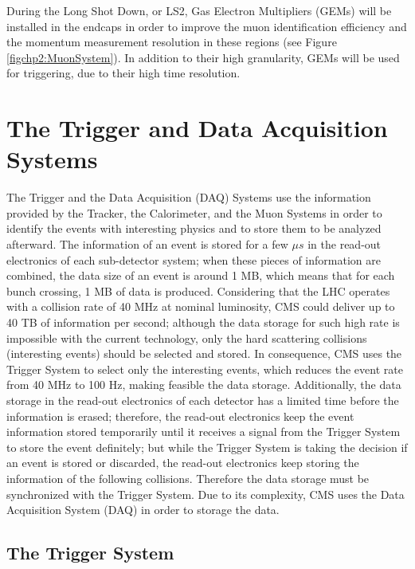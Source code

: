 \noindent During the Long Shot Down, or LS2, Gas Electron Multipliers (GEMs) will be installed in 
the endcaps in order to improve the muon identification efficiency and
the momentum measurement resolution in these regions (see Figure \ref{figchp2:MuonSystem}). In 
addition to their high granularity, GEMs will be used for triggering,
due to their high time resolution.

\section{The Trigger and Data Acquisition Systems}
\label{sec:Trigger}

\noindent The Trigger and the Data Acquisition (DAQ) Systems use the information 
provided by the Tracker, the Calorimeter, and the Muon Systems in order 
to identify the events with interesting physics and to store them to be 
analyzed afterward. The information of an event is stored for a few $\mu s$ in 
the read-out electronics of each sub-detector system; when these pieces of 
information are combined, the data size of an event is around 1 MB, which means 
that for each bunch crossing, 1 MB of data is produced. Considering that the LHC 
operates with a collision rate of 40 MHz at nominal luminosity, CMS could 
deliver up to 40 TB of information per second; although the data storage 
for such high rate is impossible with the current technology, only the hard
scattering collisions (interesting events) should be selected and stored. In 
consequence, CMS uses the Trigger System to select only the interesting events, which 
reduces the event rate from 40 MHz to 100 Hz, making feasible the data 
storage. Additionally, the data storage in the read-out electronics of 
each detector has a limited time before the information is erased; therefore, the 
read-out electronics keep the event information stored
temporarily until it receives a signal from the Trigger System 
to store the event definitely; but while the Trigger System is taking the decision 
if an event is stored or discarded, the read-out electronics keep storing the 
information of the following collisions. Therefore the data storage must 
be synchronized with the Trigger System. Due to its complexity, CMS uses the 
Data Acquisition System (DAQ) in order to storage the data.

\subsection{The Trigger System}
\label{subsec:Trigger}

